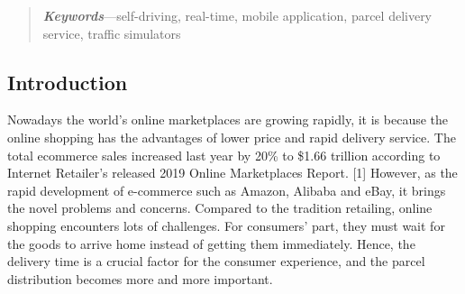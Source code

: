 \documentclass[12pt]{ksthesis}
\begin{document}
\begin{preliminary}
\begin{abstract}
\emph{\textbf{Keywords}}---self-driving, real-time, mobile application, parcel delivery service, traffic simulators

\end{abstract}

\begin{acknowledgements}
\Thesisspace {\large }

\end{acknowledgements}

\tableofcontents \listoffigures\clearpage

\end{preliminary}
\begin{thesis}\large {
\chapter{Introduction} \label{Chap:Introduction}

Nowadays the world’s online marketplaces are growing rapidly, it is because the online shopping has the advantages of lower price and rapid delivery service. The total ecommerce sales increased last year by 20\% to \$1.66 trillion according to Internet Retailer’s released 2019 Online Marketplaces Report. [1] However, as the rapid development of e-commerce such as Amazon, Alibaba and eBay, it brings the novel problems and concerns. Compared to the tradition retailing, online shopping encounters lots of challenges. For consumers’ part, they must wait for the goods to arrive home instead of getting them immediately. Hence, the delivery time is a crucial factor for the consumer experience, and the parcel distribution becomes more and more important. 




}
\end{thesis}
\end{document}
